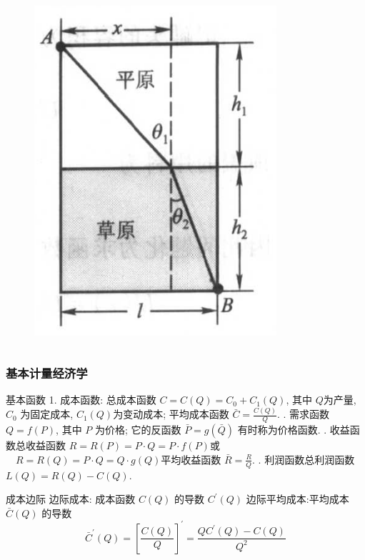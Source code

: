 \documentclass[
10pt,
aspectratio=43,
]{beamer}
\begin{document}
\begin{frame}
\begin{columns}
\begin{column}{0.4\textwidth}
\begin{figure}
				\includegraphics[width=0.8\textwidth]{light.png}
			\end{figure}
		\end{column}
	\end{columns}
\end{frame}

\begin{frame}
	\frametitle{基本计量经济学}

	\begin{block}{基本函数}
		1. 成本函数: 总成本函数 $C=C(Q)=C_0+C_1(Q)$, 其中 $Q$为产量, $C_0$ 为固定成本, $C_1(Q)$为变动成本; 平均成本函数 $\bar{C}=\frac{C(Q)}{Q}$.
		. 需求函数 $Q=f(P)$, 其中 $P$ 为价格; 它的反函数 $\bar{P}=g(\bar{Q})$ 有时称为价格函数.
		. 收益函数总收益函数 $R=R(P)=P \cdot Q=P \cdot f(P)$或 $\quad R=R(Q)=P \cdot Q=Q \cdot g(Q)$平均收益函数 $\bar{R}=\frac{R}{Q}$.
		. 利润函数总利润函数 $L(Q)=R(Q)-C(Q)$.
	\end{block}
	\pause
	\begin{block}{成本边际}
		边际成本: 成本函数 $C(Q)$ 的导数 $C^{\prime}(Q)$
		\pause
		边际平均成本:平均成本 $\bar{C}(Q)$ 的导数
		$$
			\bar{C}^{\prime}(Q)=\left[\frac{C(Q)}{Q}\right]^{\prime}=\frac{Q C^{\prime}(Q)-C(Q)}{Q^2}
		$$
	\end{block}
\end{frame}
\end{document}
